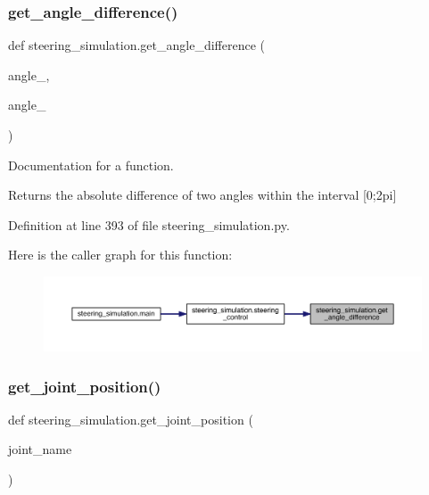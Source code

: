 \subsubsection{\texorpdfstring{get\_angle\_difference()}{get\_angle\_difference()}}
{\footnotesize\ttfamily def steering\+\_\+simulation.\+get\+\_\+angle\+\_\+difference (\begin{DoxyParamCaption}\item[{}]{angle\+\_,  }\item[{}]{angle\+\_ }\end{DoxyParamCaption})}



Documentation for a function. 

Returns the absolute difference of two angles within the interval \mbox{[}0;2pi\mbox{]} 

Definition at line 393 of file steering\+\_\+simulation.\+py.


\begin{DoxyCode}{0}

\end{DoxyCode}
Here is the caller graph for this function\+:\nopagebreak
\begin{figure}[H]
\begin{center}
\leavevmode
\includegraphics[width=350pt]{namespacesteering__simulation_a920f69692c79162b2296b1a220bba527_icgraph}
\end{center}
\end{figure}
\mbox{\label{namespacesteering__simulation_af5611a9446037e0aee0542ebe1c111fc}} 
\subsubsection{\texorpdfstring{get\_joint\_position()}{get\_joint\_position()}}
{\footnotesize\ttfamily def steering\+\_\+simulation.\+get\+\_\+joint\+\_\+position (\begin{DoxyParamCaption}\item[{}]{joint\+\_\+name }\end{DoxyParamCaption})}




